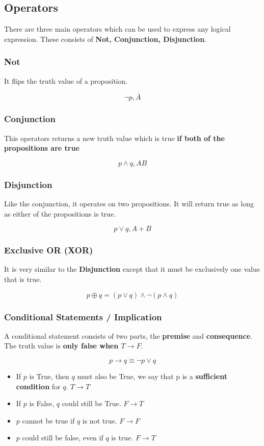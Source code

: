 \documentclass[11pt]{article}
\begin{document}
\subsection{Operators}
\label{sec:org3154298}
There are three main operators which can be used to express any logical expression. These consists of \textbf{Not, Conjunction, Disjunction}.
\subsubsection{Not}
\label{sec:orgf190e6a}
It flips the truth value of a proposition.

\[
\neg p, \bar{A}
\]
\subsubsection{Conjunction}
\label{sec:org7864529}
This operators returns a new truth value which is true \textbf{if both of the propositions are true}

\[
p \land q, AB
\]
\subsubsection{Disjunction}
\label{sec:orgcac3798}
Like the conjunction, it operates on two propositions. It will return true as long as either of the propositions is true.

\[
p \lor q, A+B
\]
\subsubsection{Exclusive OR (XOR)}
\label{sec:org4fd5d08}
It is very similar to the \textbf{Disjunction} except that it must be exclusively one value that is true.

\[
p \oplus q = (p \lor q) \land \neg(p \land q)
\]

\subsubsection{Conditional Statements / Implication}
\label{sec:org7870440}
A conditional statement consists of two parts, the \textbf{premise} and \textbf{consequence}. The truth value is \textbf{only false when \(T \to F\)}.

\[
p \to q \equiv \neg p \lor q
\]

\begin{itemize}
\item If \(p\) is True, then \(q\) must also be True, we say that p is a \textbf{sufficient condition} for \(q\). \(T \to T\)
\item If \(p\) is False, \(q\) could still be True. \(F \to T\)
\item \(p\) cannot be true if \(q\) is not true. \(F \to F\)
\item \(p\) could still be false, even if \(q\) is true. \(F \to T\)
\end{itemize}
\end{document}
